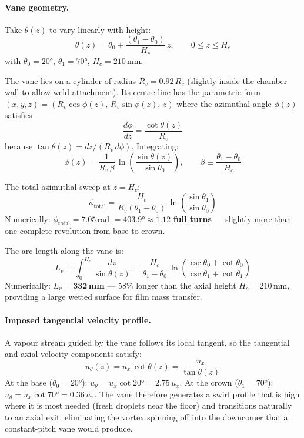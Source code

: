 \documentclass[11pt,letterpaper]{article}
\begin{document}
\paragraph{Vane geometry.}
Take $\theta(z)$ to vary linearly with height:
\begin{equation}
  \theta(z) = \theta_0 + \frac{(\theta_1 - \theta_0)}{H_c}\,z,
  \qquad 0 \le z \le H_c
  \label{eq:theta_z}
\end{equation}
with $\theta_0 = 20°$, $\theta_1 = 70°$, $H_c = 210$\,mm.

The vane lies on a cylinder of radius $R_v = 0.92\,R_c$ (slightly inside
the chamber wall to allow weld attachment).  Its centre-line has the
parametric form $(x, y, z) = (R_v\cos\phi(z),\,R_v\sin\phi(z),\,z)$
where the azimuthal angle $\phi(z)$ satisfies
\[
  \frac{d\phi}{dz} = \frac{\cot\theta(z)}{R_v}
\]
because $\tan\theta(z) = dz/(R_v\,d\phi)$.  Integrating:
\begin{equation}
  \phi(z) = \frac{1}{R_v\,\beta}\,\ln\!\left(\frac{\sin\theta(z)}{\sin\theta_0}\right),
  \qquad \beta \equiv \frac{\theta_1 - \theta_0}{H_c}
  \label{eq:phi_z}
\end{equation}

The total azimuthal sweep at $z = H_c$:
\begin{equation}
  \phi_{\mathrm{total}} = \frac{H_c}{R_v(\theta_1-\theta_0)}\,
  \ln\!\left(\frac{\sin\theta_1}{\sin\theta_0}\right)
  \label{eq:phi_total}
\end{equation}
Numerically: $\phi_{\mathrm{total}} = 7.05$\,rad $= 403.9° \approx \mathbf{1.12}$
\textbf{full turns} — slightly more than one complete revolution from base
to crown.

The arc length along the vane is:
\begin{equation}
  L_v = \int_0^{H_c} \frac{dz}{\sin\theta(z)}
       = \frac{H_c}{\theta_1-\theta_0}\,
         \ln\!\left(\frac{\csc\theta_0 + \cot\theta_0}{\csc\theta_1 + \cot\theta_1}\right)
  \label{eq:arc_length}
\end{equation}
Numerically: $L_v = \mathbf{332}$\,\textbf{mm} — 58\% longer than the axial
height $H_c = 210$\,mm, providing a large wetted surface for film mass
transfer.

\paragraph{Imposed tangential velocity profile.}
A vapour stream guided by the vane follows its local tangent, so the
tangential and axial velocity components satisfy:
\begin{equation}
  u_\theta(z) = u_x\,\cot\theta(z) = \frac{u_x}{\tan\theta(z)}
  \label{eq:u_theta_z}
\end{equation}
At the base ($\theta_0 = 20°$): $u_\theta = u_x\cot 20° = 2.75\,u_x$.
At the crown ($\theta_1 = 70°$): $u_\theta = u_x\cot 70° = 0.36\,u_x$.
The vane therefore generates a swirl profile that is high where it is
most needed (fresh droplets near the floor) and transitions naturally
to an axial exit, eliminating the vortex spinning off into the
downcomer that a constant-pitch vane would produce.
\end{document}
